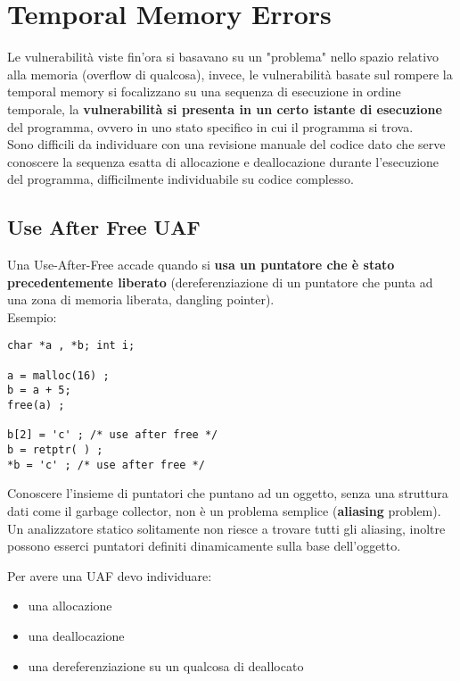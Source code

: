 \section{Temporal Memory Errors}

Le vulnerabilità viste fin'ora si basavano su un "problema" nello spazio relativo alla memoria (overflow di qualcosa), invece, le vulnerabilità basate sul rompere la temporal memory si focalizzano su una sequenza di esecuzione in ordine temporale, la \textbf{vulnerabilità si presenta in un certo istante di esecuzione} del programma, ovvero in uno stato specifico in cui il programma si trova.\\ 

Sono difficili da individuare con una revisione manuale del codice dato che serve conoscere la sequenza esatta di allocazione e deallocazione durante l'esecuzione del programma, difficilmente individuabile su codice complesso.\\

\subsection{Use After Free UAF}
Una Use-After-Free accade quando si \textbf{usa un puntatore che è stato precedentemente liberato} (dereferenziazione di un puntatore che punta ad una zona di memoria liberata, dangling pointer).\\

Esempio: 
\begin{verbatim}
char *a , *b; int i;

a = malloc(16) ;
b = a + 5;
free(a) ;

b[2] = 'c' ; /* use after free */
b = retptr( ) ;
*b = 'c' ; /* use after free */
\end{verbatim}

Conoscere l'insieme di puntatori che puntano ad un oggetto, senza una struttura dati come il garbage collector, non è un problema semplice (\textbf{aliasing} problem). Un analizzatore statico solitamente non riesce a trovare tutti gli aliasing, inoltre possono esserci puntatori definiti dinamicamente sulla base dell'oggetto. \\

\newpage

Per avere una UAF devo individuare: 
\begin{itemize}
	\item una allocazione
	\item una deallocazione
	\item una dereferenziazione su un qualcosa di deallocato
\end{itemize}

